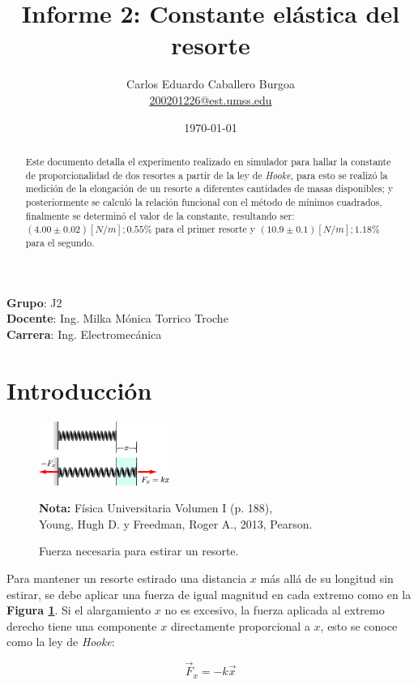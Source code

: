\documentclass[letter,11pt]{article}
\title{Informe 2: Constante elástica del resorte}
\author{Carlos Eduardo Caballero Burgoa \\
    \small{\href{mailto:200201226@est.umss.edu}{200201226@est.umss.edu}}
}
\date{\today}
\newcommand{\source}[1]{\vspace{-11pt} \caption*{\small{\textbf{Nota:} {#1}}}}
\begin{document}
\maketitle
\begin{center}
    \textbf{Grupo}: J2\\
    \textbf{Docente}: Ing. Milka Mónica Torrico Troche\\
    \textbf{Carrera}: Ing. Electromecánica
\end{center}

\begin{abstract}
Este documento detalla el experimento realizado en simulador para hallar la
constante de proporcionalidad de dos resortes a partir de la ley de
\emph{Hooke}, para esto se realizó la medición de la elongación de un resorte a
diferentes cantidades de masas disponibles; y posteriormente se calculó la 
relación funcional con el método de mínimos cuadrados, finalmente se determinó
el valor de la constante, resultando ser: $(4.00 \pm 0.02)[N/m]; 0.55\%$ para el
primer resorte y $(10.9 \pm 0.1)[N/m]; 1.18\%$ para el segundo.
\end{abstract}

\section{Introducción}

\begin{figure}
\centering
\includegraphics[width=0.38\textwidth]{resources/f1.eps}
\caption{Fuerza necesaria para estirar un resorte.}
\label{figura1}
\source{Física Universitaria Volumen I (p. 188), \\
Young, Hugh D. y Freedman, Roger A., 2013, Pearson.}
\end{figure}

Para mantener un resorte estirado una distancia $x$ más allá de su longitud sin
estirar, se debe aplicar una fuerza de igual magnitud en cada extremo como en la
\textbf{Figura \ref{figura1}}. Si el alargamiento $x$ no es excesivo, la fuerza
aplicada al extremo derecho tiene una componente $x$ directamente proporcional
a $x$, esto se conoce como la ley de \emph{Hooke}:

\begin{equation}
    \vec{F}_x = - k \vec{x}
\label{hooke}
\end{equation}
\vspace{0.10cm}
\end{document}
